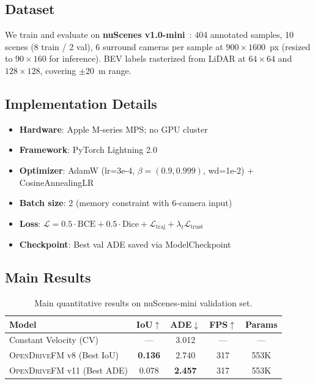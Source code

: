 \documentclass[10pt,twocolumn]{article}
\newcommand{\ours}{\textsc{OpenDriveFM}\xspace}
\newcommand{\best}[1]{\textbf{\color{mygreen}#1}}
\begin{document}
\subsection{Dataset}

We train and evaluate on \textbf{nuScenes v1.0-mini}~\cite{caesar2020nuscenes}:
404 annotated samples, 10 scenes (8 train / 2 val), 6 surround cameras
per sample at $900\!\times\!1600$~px (resized to $90\!\times\!160$ for
inference). BEV labels rasterized from LiDAR at $64\!\times\!64$ and
$128\!\times\!128$, covering $\pm20$~m range.

\subsection{Implementation Details}

\begin{itemize}[leftmargin=*,topsep=2pt,itemsep=1pt]
  \item \textbf{Hardware}: Apple M-series MPS; no GPU cluster
  \item \textbf{Framework}: PyTorch Lightning 2.0
  \item \textbf{Optimizer}: AdamW (lr=3e-4, $\beta=(0.9,0.999)$,
        wd=1e-2) + CosineAnnealingLR
  \item \textbf{Batch size}: 2 (memory constraint with 6-camera input)
  \item \textbf{Loss}: $\mathcal{L} = 0.5\cdot\text{BCE} +
        0.5\cdot\text{Dice} + \mathcal{L}_{\text{traj}} +
        \lambda_t\mathcal{L}_{\text{trust}}$
  \item \textbf{Checkpoint}: Best val ADE saved via ModelCheckpoint
\end{itemize}

\subsection{Main Results}

\begin{table}[h]
\centering
\caption{Main quantitative results on nuScenes-mini validation set.}
\label{tab:main}
\scriptsize
\setlength{\tabcolsep}{4pt}
\begin{tabular}{@{}lcccc@{}}
\toprule
\textbf{Model} & \textbf{IoU$\uparrow$} & \textbf{ADE$\downarrow$} &
\textbf{FPS$\uparrow$} & \textbf{Params} \\
\midrule
Constant Velocity (CV) & --- & 3.012 & --- & --- \\
\midrule
\ours v8 (Best IoU) & \best{0.136} & 2.740 & 317 & 553K \\
\ours v11 (Best ADE) & 0.078 & \best{2.457} & 317 & 553K \\
\bottomrule
\end{tabular}
\end{table}
\end{document}

